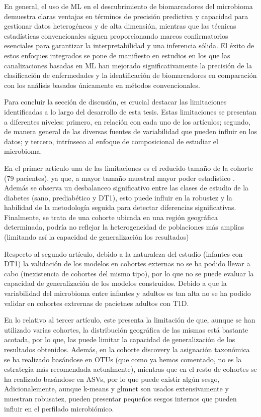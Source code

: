 En general, el uso de ML en el descubrimiento de biomarcadores del microbioma demuestra claras ventajas en términos de precisión predictiva y capacidad para gestionar datos heterogéneos y de alta dimensión, mientras que las técnicas estadísticas convencionales siguen proporcionando marcos confirmatorios esenciales para garantizar la interpretabilidad y una inferencia sólida. El éxito de estos enfoques integrados se pone de manifiesto en estudios en los que las canalizaciones basadas en ML han mejorado significativamente la precisión de la clasificación de enfermedades y la identificación de biomarcadores en comparación con los análisis basados únicamente en métodos convencionales.



Para concluir la sección de discusión, es crucial destacar las limitaciones identificadas a lo largo del desarrollo de esta tesis. Estas limitaciones se presentan a diferentes niveles: primero, en relación con cada uno de los artículos; segundo, de manera general de las diversas fuentes de variabilidad que pueden influir en los datos; y tercero, intrínseco al enfoque de composicional de estudiar el microbioma.

En el primer artículo una de las limitaciones es el reducido tamaño de la cohorte (79 pacientes), ya que, a mayor tamaño muestral mayor poder estadístico . Además se observa un desbalanceo significativo entre las clases de estudio de la diabetes (sano, prediabético y DT1), esto puede influir en la robustez y la habilidad de la metodología seguida para detectar diferencias significativas. Finalmente, se trata de una cohorte ubicada en una región geográfica determinada, podría no reflejar la heterogeneidad de poblaciones más amplias (limitando así la capacidad de generalización los resultados)

Respecto al segundo artículo, debido a la naturaleza del estudio (infantes con DT1) la validación de los modelos en cohortes externas no se ha podido llevar a cabo (inexistencia de cohortes del mismo tipo), por lo que no se puede evaluar la capacidad de generalización de los modelos construídos. Debido a que la variabilidad del microbioma entre infantes y adultos es tan alta no se ha podido validar en cohortes extrernas de pacietnes adultos con T1D.

En lo relativo al tercer artículo, este presenta la limitación de que, aunque se han utilizado varias cohortes, la distribución geográfica de las mismas está bastante acotada, por lo que, las puede limitar la capacidad de generalización de los resultados obtenidos. Además, en la cohorte discovery la asignación taxonómica se ha realizado basándose en OTUs (que como ya hemos comentado, no es la estrategia más recomendada actualmente), mientras que en el resto de cohortes se ha realizado basándose en ASVs, por lo que puede existir algún sesgo, Adicionalemente, aunque k-means y glmnet son usados extensivamente y muestran robusatez, pueden presentar pequeños sesgos internos que pueden influir en el perfilado microbiómico.

